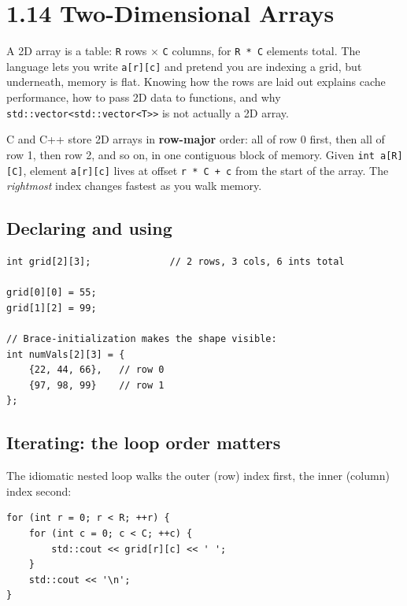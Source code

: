 \documentclass[11pt]{article}
\begin{document}
\section{1.14 Two-Dimensional Arrays}

A 2D array is a table: \texttt{R} rows $\times$ \texttt{C} columns, for
\texttt{R * C} elements total. The language lets you write
\texttt{a[r][c]} and pretend you are indexing a grid, but underneath,
memory is flat. Knowing how the rows are laid out explains cache
performance, how to pass 2D data to functions, and why
\texttt{std::vector<std::vector<T>>} is not actually a 2D array.

\begin{defnbox}
C and C++ store 2D arrays in \textbf{row-major} order: all of row 0
first, then all of row 1, then row 2, and so on, in one contiguous
block of memory. Given \texttt{int a[R][C]}, element \texttt{a[r][c]}
lives at offset \texttt{r * C + c} from the start of the array. The
\emph{rightmost} index changes fastest as you walk memory.
\end{defnbox}

\subsection{Declaring and using}

\begin{examplebox}
\begin{verbatim}
int grid[2][3];              // 2 rows, 3 cols, 6 ints total

grid[0][0] = 55;
grid[1][2] = 99;

// Brace-initialization makes the shape visible:
int numVals[2][3] = {
    {22, 44, 66},   // row 0
    {97, 98, 99}    // row 1
};
\end{verbatim}
\end{examplebox}

\subsection{Iterating: the loop order matters}

The idiomatic nested loop walks the outer (row) index first, the inner
(column) index second:

\begin{examplebox}
\begin{verbatim}
for (int r = 0; r < R; ++r) {
    for (int c = 0; c < C; ++c) {
        std::cout << grid[r][c] << ' ';
    }
    std::cout << '\n';
}
\end{verbatim}
\end{examplebox}
\end{document}
